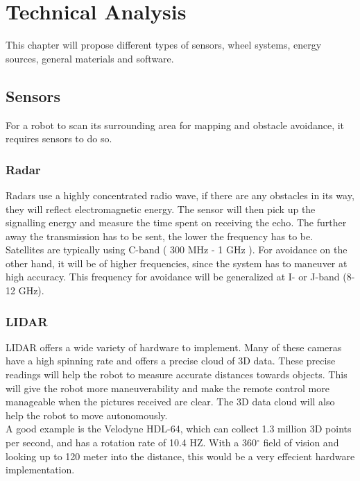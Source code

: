 \chapter{Technical Analysis}\label{ch:solutionProposal}
This chapter will propose different types of sensors, wheel systems, energy sources, general materials and software.

\section{Sensors}
For a robot to scan its surrounding area for mapping and obstacle avoidance, it requires sensors to do so.

\subsection{Radar}
Radars use a highly concentrated radio wave, if there are any obstacles in its way, they will reflect electromagnetic energy. The sensor will then pick up the signalling energy and measure the time spent on receiving the echo\cite{Radar}.
The further away the transmission has to be sent, the lower the frequency has to be.\\
Satellites are typically using C-band ( 300 MHz - 1 GHz ). 
For avoidance on the other hand, it will be of higher frequencies, since the system has to maneuver at high accuracy. This frequency for avoidance will be generalized at I- or J-band (8-12 GHz)\cite{RadarTutorial}.



\subsection{LIDAR}\label{ch:sensorLidar}
LIDAR offers a wide variety of hardware to implement. Many of these cameras have a high spinning rate and offers a precise cloud of 3D data. These precise readings will help the robot to measure accurate distances towards objects. This will give the robot more maneuverability and make the remote control more manageable when the pictures received are clear. The 3D data cloud will also help the robot to move autonomously.\\
A good example is the Velodyne HDL-64, which can collect 1.3 million 3D points per second, and has a rotation rate of 10.4 HZ. With a 360${^\circ}$ field of vision and looking up to 120 meter into the distance, this would be a very effecient hardware implementation. \cite{Lidar360}

